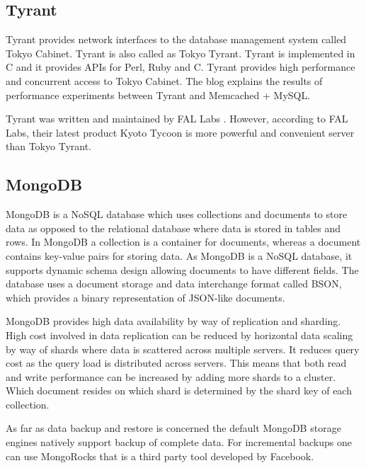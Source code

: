 \subsection{Tyrant}

     Tyrant provides network interfaces to the database management
     system called Tokyo Cabinet. Tyrant is also called as Tokyo
     Tyrant. Tyrant is implemented in C and it provides APIs for Perl,
     Ruby and C. Tyrant provides high performance and concurrent
     access to Tokyo Cabinet. The blog \cite{www-tyrant-blog} 
     explains the results of performance experiments between Tyrant and 
     Memcached + MySQL.

     Tyrant was written and maintained by FAL Labs
     \cite{www-tyrant-fal-labs}.  However, according to FAL Labs,
     their latest product \cite{www-kyoto-tycoon} Kyoto Tycoon is
     more powerful and convenient server than Tokyo Tyrant.


\subsection{MongoDB}

     MongoDB is a NoSQL database which uses collections and documents
     to store data as opposed to the relational database where data is
     stored in tables and rows. In MongoDB a collection is a container
     for documents, whereas a document contains key-value pairs for
     storing data. As MongoDB is a NoSQL database, it supports dynamic
     schema design allowing documents to have different fields. The
     database uses a document storage and data interchange format
     called BSON, which provides a binary representation of JSON-like
     documents.

     MongoDB provides high data availability by way of replication and
     sharding. High cost involved in data replication can be reduced
     by horizontal data scaling by way of shards where data is
     scattered across multiple servers. It reduces query cost as the
     query load is distributed across servers. This means that both
     read and write performance can be increased by adding more shards
     to a cluster. Which document resides on which shard is determined
     by the shard key of each collection.

     As far as data backup and restore is concerned the default
     MongoDB storage engines natively support backup of complete
     data. For incremental backups one can use MongoRocks that is a
     third party tool developed by Facebook.

